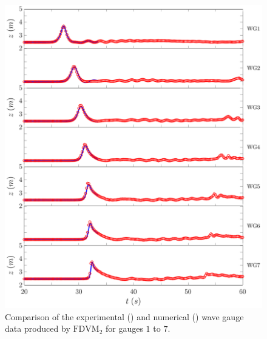 \begin{figure}
	\centering
	\includegraphics[width=\textwidth]{./chp6/figures/Experiment/Roeber/Trial8/FDVM/LongWGs1.pdf}
	\caption{Comparison of the experimental () and numerical ({\color{blue}\solidrule}) wave gauge data produced by $\text{FDVM}_2$ for gauges $1$ to $7$.}
	\label{fig:Roeber8WG1to5FDVM}
\end{figure}
